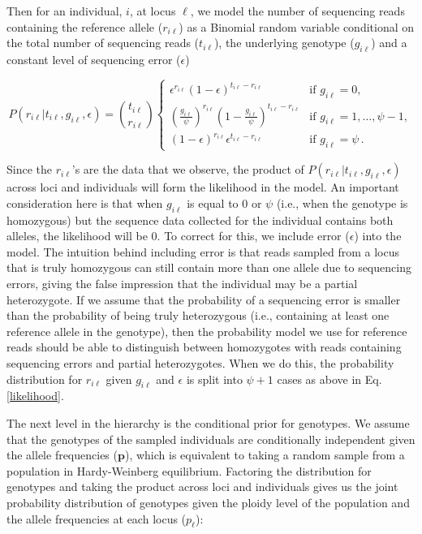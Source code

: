 \documentclass[11pt,english,letterpaper,oneside]{article}
\begin{document}
\noindent Then for an individual, $i$, at locus $\ell$, we model the number of sequencing reads containing the reference allele ($r_{i\ell}$) as a Binomial random variable conditional on the total number of sequencing reads ($t_{i\ell} $), the underlying genotype ($g_{i\ell}$) and a constant level of sequencing error ($\epsilon$)

\begin{equation}\label{likelihood}
P(r_{i \ell}|t_{i\ell}, g_{i \ell},\epsilon) = \binom{t_{i \ell}}{r_{i \ell}}
	\begin{cases}
	\epsilon^{r_{i \ell}}(1-\epsilon)^{t_{i \ell}-r_{i \ell}} & \text{if  } g_{i \ell} = 0, \\[0.05in]
	\left(\frac{g_{i \ell}}{\psi}\right)^{r_{i \ell}}\left(1-\frac{g_{i \ell}}{\psi}\right)^{t_{i \ell}-r_{i \ell}} & \text{if  } g_{i \ell} = 1,\ldots,\psi-1, \\[0.05in]
	(1-\epsilon)^{r_{i \ell}}\epsilon^{t_{i \ell}-r_{i \ell}} & \text{if  } g_{i \ell} = \psi\,.
	\end{cases}
\end{equation}

\noindent Since the $r_{i \ell}$'s are the data that we observe, the product of $P(r_{i \ell}|t_{i\ell}, g_{i \ell},\epsilon)$ across loci and individuals will form the likelihood in the model. An important consideration here is that when $g_{i \ell}$ is equal to 0 or $\psi$ (i.e., when the genotype is homozygous) but the sequence data collected for the individual contains both alleles, the likelihood will be 0. To correct for this, we include error ($\epsilon$) into the model. The intuition behind including error is that reads sampled from a locus that is truly homozygous can still contain more than one allele due to sequencing errors, giving the false impression that the individual may be a partial heterozygote. If we assume that the probability of a sequencing error is smaller than the probability of being truly heterozygous (i.e., containing at least one reference allele in the genotype), then the probability model we use for reference reads should be able to distinguish between homozygotes with reads containing sequencing errors and partial heterozygotes. When we do this, the probability distribution for $r_{i\ell}$ given $g_{i\ell}$ and $\epsilon$ is split into $\psi+1$ cases as above in Eq. \ref{likelihood}.
\medskip

The next level in the hierarchy is the conditional prior for genotypes. We assume that the genotypes of the sampled individuals are conditionally independent given the allele frequencies ($\bm{p}$), which is equivalent to taking a random sample from a population in Hardy-Weinberg equilibrium. Factoring the distribution for genotypes and taking the product across loci and individuals gives us the joint probability distribution of genotypes given the ploidy level of the population and the allele frequencies at each locus ($p_{\ell}$):
\end{document}
